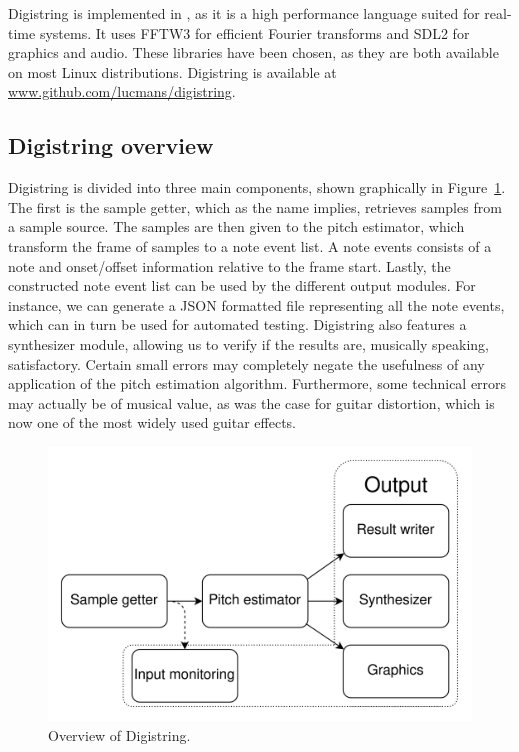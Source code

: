 \documentclass[a4paper,10pt,twocolumn]{article}
\begin{document}
Digistring is implemented in \cpluspluslogo, as it is a high performance language suited for real-time systems. It uses FFTW3 for efficient Fourier transforms and SDL2 for graphics and audio. These libraries have been chosen, as they are both available on most Linux distributions. Digistring is available at \url{www.github.com/lucmans/digistring}.


\subsection{Digistring overview}
Digistring is divided into three main components, shown graphically in Figure~\ref{fig:digistring_overview}. The first is the sample getter, which as the name implies, retrieves samples from a sample source. The samples are then given to the pitch estimator, which transform the frame of samples to a note event list. A note events consists of a note and onset/offset information relative to the frame start. Lastly, the constructed note event list can be used by the different output modules. For instance, we can generate a JSON formatted file representing all the note events, which can in turn be used for automated testing. Digistring also features a synthesizer module, allowing us to verify if the results are, musically speaking, satisfactory. Certain small errors may completely negate the usefulness of any application of the pitch estimation algorithm. Furthermore, some technical errors may actually be of musical value, as was the case for guitar distortion, which is now one of the most widely used guitar effects.
\begin{figure}[h]
    \centering
    \includegraphics[width=\linewidth]{fig/digistring_overview.png}
    \caption{Overview of Digistring.}
    \label{fig:digistring_overview}
\end{figure}
\end{document}
